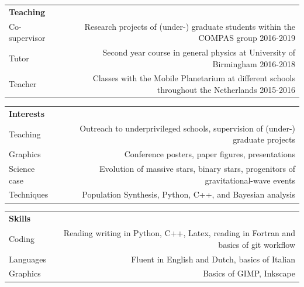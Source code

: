 \documentclass[]{res} %
\begin{document}
\begin{tabular}{L!{\VRule}R}
\Large \bf Teaching \normalsize & \\ [5pt]
Co-supervisor   & {Research projects of (under-) graduate students within the COMPAS group 2016-2019}\\[5pt]

Tutor   & {Second year course in general physics at  University of Birmingham 2016-2018}\\[5pt]

Teacher & {Classes with the Mobile Planetarium at different schools throughout the Netherlands 2015-2016}\\[5pt]

\end{tabular}




\begin{tabular}{L!{\VRule}R}
\Large \bf Interests \normalsize & \\ [5pt]

Teaching  & {Outreach to underprivileged schools, supervision of (under-) graduate projects}\\[5pt]

Graphics  & {Conference posters, paper figures, presentations}\\[5pt]

Science case   &{Evolution of massive stars, binary stars, progenitors of gravitational-wave events}\\[5pt]

Techniques  & {Population Synthesis, Python, C++, and Bayesian analysis}\\[5pt]




\end{tabular}


\begin{tabular}{L!{\VRule}R}
\Large \bf Skills \normalsize & \\ [5pt]

Coding   & {Reading writing in Python, C++, Latex, reading in Fortran and basics of git workflow}\\[5pt]

Languages & {Fluent in English and Dutch, basics of Italian}\\[5pt]

Graphics  & {Basics of GIMP, Inkscape}

\end{tabular}

\newpage
\end{document}
